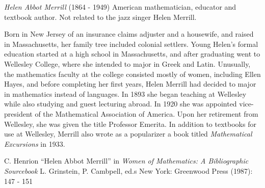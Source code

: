 \documentclass[12pt]{article}
\begin{document}

\emph{Helen Abbot Merrill} (1864 - 1949) American mathematician, educator and textbook author. Not related to the jazz singer Helen Merrill.

Born in New Jersey of an insurance claims adjuster and a housewife, and raised in Massachusetts, her family tree included colonial settlers. Young Helen's formal education started at a high school in Massachusetts, and after graduating went to Wellesley College, where she intended to major in Greek and Latin. Unusually, the mathematics faculty at the college consisted mostly of women, including Ellen Hayes, and before completing her first years, Helen Merrill had decided to major in mathematics instead of languages. In 1893 she began teaching at Wellesley while also studying and guest lecturing abroad. In 1920 she was appointed vice-president of the Mathematical Association of America. Upon her retirement from Wellesley, she was given the title Professor Emerita. In addition to textbooks for use at Wellesley, Merrill also wrote as a popularizer a book titled {\it Mathematical Excursions} in 1933.

\begin{thebibliography}{1}
 C. Henrion ``Helen Abbot Merrill'' in {\it Women of Mathematics: A Bibliographic Sourcebook} L. Grinstein, P. Cambpell, ed.s New York: Greenwood Press (1987): 147 - 151
\end{thebibliography}
\end{document}
